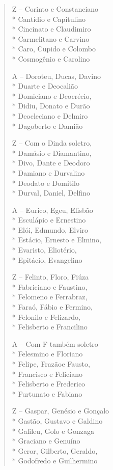 \begin{verse}
Z -- Corinto e Constanciano\\*
Cantídio e Capitulino\\*
Cincinato e Claudimiro\\*
Carmelitano e Carvino\\*
Caro, Cupido e Colombo\\*
Cosmogênio e Carolino

A -- Doroteu, Ducas, Davino\\*
Duarte e Deocalião\\*
Domiciano e Deocrécio,\\*
Didiu, Donato e Durão\\*
Deocleciano e Delmiro\\*
Dagoberto e Damião

Z -- Com o Dinda soletro,\\*
Damásio e Diamantino,\\*
Divo, Dante e Deodoro\\*
Damiano e Durvalino\\*
Deodato e Domitilo\\*
Durval, Daniel, Delfino

A -- Eurico, Egeu, Elisbão\\*
Esculápio e Ernestino\\*
Elói, Edmundo, Elviro\\*
Estácio, Ernesto e Elmino,\\*
Evaristo, Eliotério,\\*
Epitácio, Evangelino

Z -- Felinto, Floro, Fiúza\\*
Fabriciano e Faustino,\\*
Felomeno e Ferrabraz,\\*
Faraó, Fábio e Fermino,\\*
Felonilo e Felizardo,\\*
Felisberto e Francilino

A -- Com F também soletro\\*
Felesmino e Floriano\\*
Felipe, Frazãoe Fausto,\\*
Francisco e Feliciano\\*
Felisberto e Frederico\\*
Furtunato e Fabiano

Z -- Gaspar, Genésio e Gonçalo\\*
Gastão, Gustavo e Galdino\\*
Galileu, Golo e Gonzaga\\*
Graciano e Genuíno\\*
Geror, Gilberto, Geraldo,\\*
Godofredo e Guilhermino


\end{verse}
